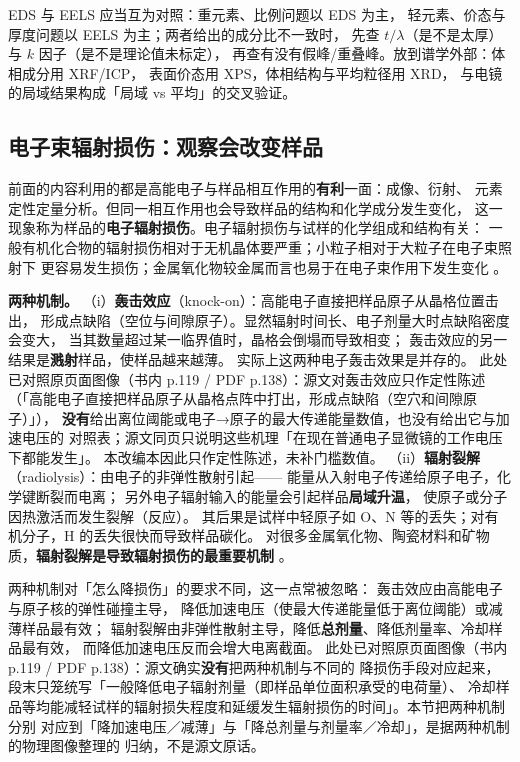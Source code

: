 \begin{crosscheck}
EDS 与 EELS 应当互为对照：重元素、比例问题以 EDS 为主，
轻元素、价态与厚度问题以 EELS 为主；两者给出的成分比不一致时，
先查 $t/\lambda$（是不是太厚）与 $k$ 因子（是不是理论值未标定），
再查有没有假峰/重叠峰。放到谱学外部：体相成分用 XRF/ICP，
表面价态用 XPS，体相结构与平均粒径用 XRD，
与电镜的局域结果构成「局域 vs 平均」的交叉验证。
\end{crosscheck}

\subsection{电子束辐射损伤：观察会改变样品}

前面的内容利用的都是高能电子与样品相互作用的\textbf{有利}一面：成像、衍射、
元素定性定量分析。但同一相互作用也会导致样品的结构和化学成分发生变化，
这一现象称为样品的\textbf{电子辐射损伤}。电子辐射损伤与试样的化学组成和结构有关：
一般有机化合物的辐射损伤相对于无机晶体要严重；小粒子相对于大粒子在电子束照射下
更容易发生损伤；金属氧化物较金属而言也易于在电子束作用下发生变化
。

\begin{principle}
\textbf{两种机制。}
（i）\textbf{轰击效应}（knock-on）：高能电子直接把样品原子从晶格位置击出，
形成点缺陷（空位与间隙原子）。显然辐射时间长、电子剂量大时点缺陷密度会变大，
当其数量超过某一临界值时，晶格会倒塌而导致相变；
轰击效应的另一结果是\textbf{溅射}样品，使样品越来越薄。
实际上这两种电子轰击效果是并存的。
此处已对照原页面图像（书内 p.119 / PDF p.138）：源文对轰击效应只作定性陈述
（「高能电子直接把样品原子从晶格点阵中打出，形成点缺陷（空穴和间隙原子）」），
\textbf{没有}给出离位阈能或电子→原子的最大传递能量数值，也没有给出它与加速电压的
对照表；源文同页只说明这些机理「在现在普通电子显微镜的工作电压下都能发生」。
本改编本因此只作定性陈述，未补门槛数值。
（ii）\textbf{辐射裂解}（radiolysis）：由电子的非弹性散射引起——
能量从入射电子传递给原子电子，化学键断裂而电离；
另外电子辐射输入的能量会引起样品\textbf{局域升温}，
使原子或分子因热激活而发生裂解（反应）。
其后果是试样中轻原子如 O、N 等的丢失；对有机分子，H 的丢失很快而导致样品碳化。
对很多金属氧化物、陶瓷材料和矿物质，\textbf{辐射裂解是导致辐射损伤的最重要机制}
。

两种机制对「怎么降损伤」的要求不同，这一点常被忽略：
轰击效应由高能电子与原子核的弹性碰撞主导，
降低加速电压（使最大传递能量低于离位阈能）或减薄样品最有效；
辐射裂解由非弹性散射主导，降低\textbf{总剂量}、降低剂量率、冷却样品最有效，
而降低加速电压反而会增大电离截面。
此处已对照原页面图像（书内 p.119 / PDF p.138）：源文确实\textbf{没有}把两种机制与不同的
降损伤手段对应起来，段末只笼统写「一般降低电子辐射剂量（即样品单位面积承受的电荷量）、
冷却样品等均能减轻试样的辐射损失程度和延缓发生辐射损伤的时间」。本节把两种机制分别
对应到「降加速电压／减薄」与「降总剂量与剂量率／冷却」，是据两种机制的物理图像整理的
归纳，不是源文原话。
\end{principle}

